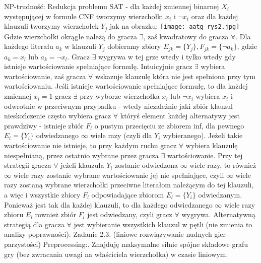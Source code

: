 \documentclass{article}
\begin{document}
NP-trudność:\newline
Redukcja problemu SAT - dla każdej zmiennej binarnej $X_i$ występującej w formule CNF tworzymy wierzchołki $x_i$ i $\neg x_i$ oraz
dla każdej klauzuli tworzymy wierzchołek $Y_j$ jak na obrazku:\newline
\texttt{[image: aatg\_rys2.jpg]}\newline
Gdzie wierzchołki okrągłe należą do gracza $\exists$, zaś kwadratowy do gracza $\forall$.
Dla każdego literału $a_k$ w klauzuli $Y_j$ dobieramy zbiory $E_{jk}=\{Y_j\},F_{jk}=\{\neg a_k\}$, gdzie $a_k=x_l$ lub $a_k=\neg x_l$.\newline
Gracz $\exists$ wygrywa w tej grze wtedy i tylko wtedy gdy istnieje wartościowanie spełniające formułę.\newline
Intuicyjnie gracz $\exists$ wybiera wartościowanie, zaś gracza $\forall$ wskazuje klauzulę która nie jest spełniona przy tym wartościowaniu.\newline
Jeśli istnieje wartościowanie spełniające formułę, to dla każdej zmiennej $x_i=1$ gracz $\exists$ przy wyborze wierzchołka $x_i$ lub $\neg x_i$ wybiera $x_i$
i odwrotnie w przeciwnym przypadku - wtedy niezależnie jaki zbiór klauzul nieskończenie często wybiera gracz $\forall$ któryś element każdej alternatywy jest prawdziwy
- istnieje zbiór $F_l$ o pustym przecięciu ze zbiorem inf, dla pewnego $E_l=\{Y_i\}$ odwiedzanego $\infty$ wiele razy
(czyli dla $Y_i$ wybieranego).
Jeżeli takie wartościowanie nie istnieje, to przy każdym ruchu gracz $\forall$ wybiera klauzulę niespełnianą,
przez ostatnio wybrane przez gracza $\exists$ wartościowanie.
Przy tej strategii gracza $\forall$ jeżeli klauzula $Y_i$ zostanie odwiedzona $\infty$ wiele razy, to również $\infty$ wiele razy zostanie wybrane wartościowanie
jej nie spełniające, czyli $\infty$ wiele razy zostaną wybrane wierzchołki przeciwne literałom należącym do tej klauzuli, a więc i wszystkie zbiory 
$F_l$ odpowiadające zbiorom $E_l=\{Y_i\}$ odwiedzanym. Ponieważ jest tak dla każdej klauzuli, to dla każdego odwiedzanego $\infty$ wiele razy zbioru $E_l$ rownież zbiór $F_l$
jest odwiedzany, czyli gracz $\forall$ wygrywa.\newline
Alternatywną strategią dla gracza $\forall$ jest wybieranie wszystkich klauzul w pętli (nie zmienia to analizy poprawności). 
\newpage
Zadanie 2.3. (liniowe rozwiązywanie nudnych gier parzystości)
\newline
\newline
Preprocessing:. Znajduję maksymalne silnie spójne składowe grafu gry (bez zwracania uwagi na właściciela wierzchołka) w czasie liniowym.\newline
\end{document}

